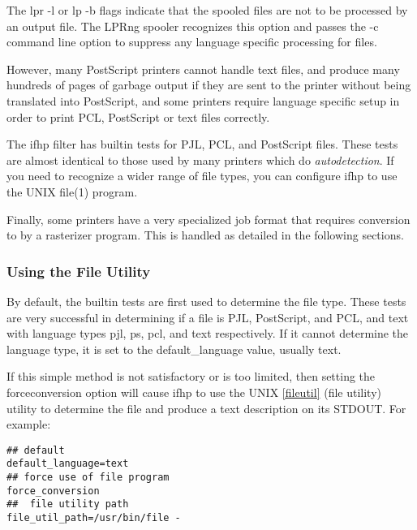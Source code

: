 \documentclass[a4paper]{article}
\begin{document}
The {\ttfamily lpr -l} or {\ttfamily lp -b} flags indicate that the spooled files
are not to be processed by an output file.
The LPRng spooler recognizes this option and passes the {\ttfamily -c}
command line option to suppress any language specific processing for files.

However,
many PostScript printers cannot handle text files,
and produce many hundreds of pages of garbage
output if they are sent to the printer without being translated
into PostScript,
and some printers require language specific setup in order to print
PCL, PostScript or text files correctly.

The {\ttfamily ifhp} filter has builtin tests for PJL,
PCL, and PostScript files.
These tests are almost identical to those used
by many printers which do
{\itshape autodetection\/}.
If you need to recognize a wider range of file types,
you can configure {\ttfamily ifhp} to use the
UNIX {\ttfamily file}(1) program.

Finally,
some printers have a very specialized job format that requires
conversion to by a
{\ttfamily rasterizer}
program.
This is handled as detailed in the following sections.


\subsubsection{Using the File Utility
\label{file_util_path}
\label{forceconversion}}

By default,
the builtin tests are first used to determine the file type.
These tests are very successful in determining if a file is
PJL, PostScript,
and PCL, and text
with language types
{\ttfamily pjl},
{\ttfamily ps},
{\ttfamily pcl},
and
{\ttfamily text} respectively.
If it cannot determine the language type, it is set to the
{\ttfamily default\_language} value, usually {\ttfamily text}.

If this simple method is not satisfactory or is too limited,
then setting the
{\ttfamily forceconversion}
option will cause {\ttfamily ifhp} to use the UNIX
\ref{fileutil} {(file utility)}
utility to determine the file and produce a text description on
its {\ttfamily STDOUT}.
For example:
\begin{tscreen}
\begin{verbatim}
## default
default_language=text
## force use of file program
force_conversion
##  file utility path
file_util_path=/usr/bin/file -
\end{verbatim}
\end{tscreen}
\end{document}
